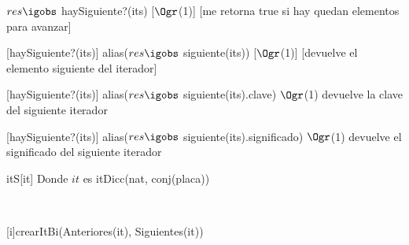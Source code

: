 \begin{Interfaz}
	{$res \igobs$ haySiguiente?(its)}
	[$\Ogr$(1)]
	[me retorna true si hay quedan elementos para avanzar]
	
	[haySiguiente?(its)]
	{alias($res \igobs$ siguiente(its))}
	[$\Ogr$(1)]
	[devuelve el elemento siguiente del iterador]
	
	[haySiguiente?(its)]
	{alias($res \igobs$ siguiente(its).clave)}
	{$\Ogr$(1)}
	{devuelve la clave del siguiente iterador}
	
	[haySiguiente?(its)]
	{alias($res \igobs$ siguiente(its).significado)}
	{$\Ogr$(1)}
	{devuelve el significado del siguiente iterador}


\end{Interfaz}

\begin{Representacion}
	
	\begin{Estructura}{itS}[it]
		Donde $it$ es itDicc(nat, conj(placa))
	\end{Estructura}
	
	
	~
	~
	
	
	{crearItBi(Anteriores(it), Siguientes(it))}
	
\end{Representacion}

